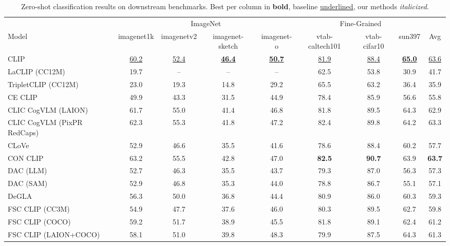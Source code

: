 \begin{table}[t]
  \centering
  \scriptsize
  \caption{Zero-shot classification results on downstream benchmarks. Best per column in \textbf{bold}, baseline \underline{underlined}, our methods \emph{italicized}.}
  \label{tab:zs_downstream}
  \begin{adjustbox}{max width=\textwidth}
  \setlength{\tabcolsep}{3pt}
  \begin{tabular}{lcccccccc}
    \toprule
     & \multicolumn{4}{c}{ImageNet} & \multicolumn{3}{c}{Fine-Grained} &  \\
    \cmidrule(lr){2-5} \cmidrule(lr){6-8}
    Model & imagenet1k & imagenetv2 & imagenet-sketch & imagenet-o & vtab-caltech101 & vtab-cifar10 & sun397 & Avg \\
    \midrule
    CLIP & \underline{60.2} & \underline{52.4} & \underline{\textbf{46.4}} & \underline{\textbf{50.7}} & \underline{81.9} & \underline{88.4} & \underline{\textbf{65.0}} & \underline{63.6} \\
    \midrule
    LaCLIP (CC12M) & 19.7 & -- & -- & -- & 62.5 & 53.8 & 30.9 & 41.7 \\
    TripletCLIP (CC12M) & 23.0 & 19.3 & 14.8 & 29.2 & 65.5 & 63.2 & 36.4 & 35.9 \\
    \midrule
    CE CLIP & 49.9 & 43.3 & 31.5 & 44.9 & 78.4 & 85.9 & 56.6 & 55.8 \\
    CLIC CogVLM (LAION) & 61.7 & 55.0 & 41.4 & 46.8 & 81.8 & 89.5 & 64.3 & 62.9 \\
    CLIC CogVLM (PixPR RedCaps) & 62.3 & 55.3 & 41.8 & 47.2 & 82.4 & 89.8 & 64.2 & 63.3 \\
    CLoVe & 52.9 & 46.6 & 35.5 & 41.6 & 78.6 & 88.4 & 60.2 & 57.7 \\
    CON CLIP & 63.2 & 55.5 & 42.8 & 47.0 & \textbf{82.5} & \textbf{90.7} & 63.9 & \textbf{63.7} \\
    DAC (LLM) & 52.7 & 46.3 & 35.5 & 43.7 & 79.3 & 87.0 & 56.3 & 57.3 \\
    DAC (SAM) & 52.9 & 46.8 & 35.3 & 44.0 & 78.8 & 86.7 & 55.1 & 57.1 \\
    DeGLA & 56.3 & 50.0 & 36.8 & 44.4 & 80.9 & 86.0 & 60.3 & 59.3 \\
    FSC CLIP (CC3M) & 54.9 & 47.7 & 37.6 & 46.0 & 80.3 & 89.5 & 62.7 & 59.8 \\
    FSC CLIP (COCO) & 59.2 & 51.7 & 38.9 & 45.5 & 81.8 & 89.1 & 62.4 & 61.2 \\
    FSC CLIP (LAION+COCO) & 58.1 & 51.0 & 39.8 & 48.3 & 79.9 & 87.5 & 64.3 & 61.3 \\

\end{tabular}
\end{adjustbox}
\end{table}
